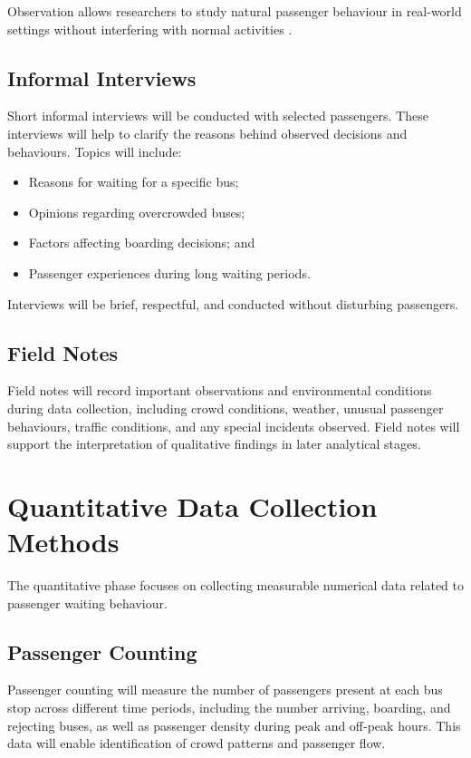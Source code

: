 \documentclass[12pt, a4paper]{report}
\begin{document}
Observation allows researchers to study natural passenger behaviour in real-world settings
without interfering with normal activities \citep{bryman2016}.

\subsection{Informal Interviews}

Short informal interviews will be conducted with selected passengers. These interviews will
help to clarify the reasons behind observed decisions and behaviours. Topics will include:

\begin{itemize}[noitemsep]
    \item Reasons for waiting for a specific bus;
    \item Opinions regarding overcrowded buses;
    \item Factors affecting boarding decisions; and
    \item Passenger experiences during long waiting periods.
\end{itemize}

Interviews will be brief, respectful, and conducted without disturbing passengers.

\subsection{Field Notes}

Field notes will record important observations and environmental conditions during data
collection, including crowd conditions, weather, unusual passenger behaviours, traffic
conditions, and any special incidents observed. Field notes will support the interpretation of
qualitative findings in later analytical stages.

\section{Quantitative Data Collection Methods}

The quantitative phase focuses on collecting measurable numerical data related to
passenger waiting behaviour.

\subsection{Passenger Counting}

Passenger counting will measure the number of passengers present at each bus stop across
different time periods, including the number arriving, boarding, and rejecting buses, as well
as passenger density during peak and off-peak hours. This data will enable identification of
crowd patterns and passenger flow.
\end{document}
